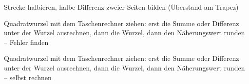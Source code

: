 \begin{aufgabe}{Strecke halbieren, halbe Differenz zweier Seiten bilden (Überstand am Trapez)}
\end{aufgabe}

\begin{aufgabe}{Quadratwurzel mit dem Taschenrechner ziehen: erst die Summe oder Differenz unter der Wurzel ausrechnen, dann die Wurzel, dann den Näherungswert runden – Fehler finden}
\end{aufgabe}

\begin{aufgabe}{Quadratwurzel mit dem Taschenrechner ziehen: erst die Summe oder Differenz unter der Wurzel ausrechnen, dann die Wurzel, dann den Näherungswert runden – selbst rechnen}
\end{aufgabe}

